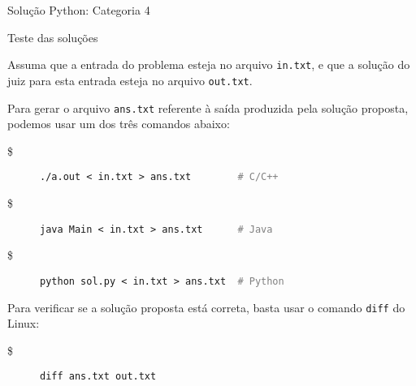 \begin{frame}[fragile]{Solução Python: Categoria 4}
\end{frame}


\begin{frame}[fragile]{Teste das soluções}

    Assuma que a entrada do problema esteja no arquivo \texttt{in.txt}, e que a solução do 
    juiz para esta entrada esteja no arquivo \texttt{out.txt}.

    Para gerar o arquivo \texttt{ans.txt} referente à saída produzida pela solução proposta,
    podemos usar um dos três comandos abaixo:

    \begin{description}
        \item[\$] \texttt{./a.out < in.txt > ans.txt  \textcolor{gray}{\ \ \ \ \ \ \  \# C/C++}}
        \item[\$] \texttt{java Main < in.txt > ans.txt  \textcolor{gray}{\ \ \ \ \ \# Java}}
        \item[\$] \texttt{python sol.py < in.txt > ans.txt  \textcolor{gray}{\ \# Python}}
    \end{description}

    Para verificar se a solução proposta está correta, basta usar o comando \texttt{diff} do
    Linux:

    \begin{description}
        \item[\$] \texttt{diff ans.txt out.txt}
    \end{description}

\end{frame}
